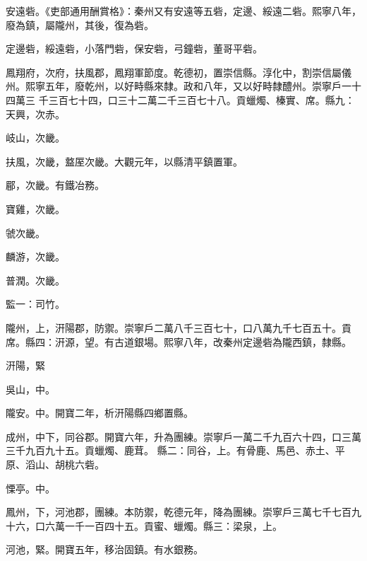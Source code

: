 \begin{pinyinscope}
 安遠砦。《吏部通用酬賞格》：秦州又有安遠等五砦，定邊、綏遠二砦。熙寧八年，廢為鎮，屬隴州，其後，復為砦。



 定邊砦，綏遠砦，小落門砦，保安砦，弓鐘砦，董哥平砦。



 鳳翔府，次府，扶風郡，鳳翔軍節度。乾德初，置崇信縣。淳化中，割崇信屬儀州。熙寧五年，廢乾州，以好畤縣來隸。政和八年，又以好畤隸醴州。崇寧戶一十四萬三
 千三百七十四，口三十二萬二千三百七十八。貢蠟燭、榛實、席。縣九：天興，次赤。



 岐山，次畿。



 扶風，次畿，盩厔次畿。大觀元年，以縣清平鎮置軍。



 郿，次畿。有鐵冶務。



 寶雞，次畿。



 虢次畿。



 麟游，次畿。



 普潤。次畿。



 監一：司竹。



 隴州，上，汧陽郡，防禦。崇寧戶二萬八千三百七十，口八萬九千七百五十。貢席。縣四：汧源，望。有古道銀場。熙寧八年，改秦州定邊砦為隴西鎮，隸縣。



 汧陽，緊



 吳山，中。



 隴安。中。開寶二年，析汧陽縣四鄉置縣。



 成州，中下，同谷郡。開寶六年，升為團練。崇寧戶一萬二千九百六十四，口三萬三千九百九十五。貢蠟燭、鹿茸。
 縣二：同谷，上。有骨鹿、馬邑、赤土、平原、滔山、胡桃六砦。



 慄亭。中。



 鳳州，下，河池郡，團練。本防禦，乾德元年，降為團練。崇寧戶三萬七千七百九十六，口六萬一千一百四十五。貢蜜、蠟燭。縣三：梁泉，上。



 河池，緊。開寶五年，移治固鎮。有水銀務。




\end{pinyinscope}
